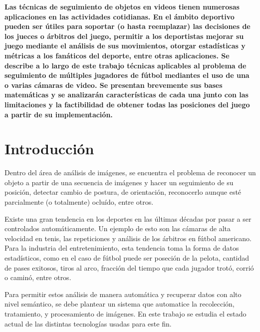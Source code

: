 \documentclass[a4paper,10pt]{article}
\title{}
\date{20 de Septiembre de 2013}
\author{Civile, Juan Pablo \and Crespo, Álvaro \and Ordano, Esteban }
\begin{document}
\pagestyle{fancy}
\maketitle
\thispagestyle{fancy}

\begin{customabstract}
\textbf{
Las técnicas de seguimiento de objetos en videos tienen numerosas aplicaciones
en las actividades cotidianas. En el ámbito deportivo pueden ser útiles para
soportar (o hasta reemplazar) las decisiones de los jueces o árbitros del
juego, permitir a los deportistas mejorar su juego mediante el análisis de sus
movimientos, otorgar estadísticas y métricas a los fanáticos del deporte, entre
otras aplicaciones. Se describe a lo largo de este trabajo técnicas
aplicables al problema de seguimiento de múltiples jugadores de fútbol
mediantes el uso de una o varias cámaras de video. Se presentan brevemente sus
bases matemáticas y se analizarán características de cada una junto con las
limitaciones y la factibilidad de obtener todas las posiciones del juego a
partir de su implementación.
} \end{customabstract}

\newpage

\part*{Introducción}

Dentro del área de análisis de imágenes, se encuentra el problema de reconocer
un objeto a partir de una secuencia de imágenes y hacer un seguimiento de su
posición, detectar cambio de postura, de orientación, reconocerlo aunque esté
parcialmente (o totalmente) ocluído, entre otros.

Existe una gran tendencia en los deportes en las últimas décadas por pasar a
ser controlados automáticamente. Un ejemplo de esto son las cámaras de alta
velocidad en tenis, las repeticiones y análisis de los árbitros en fútbol
americano. Para la industria del entretenimiento, esta tendencia toma la forma
de datos estadísticos, como en el caso de fútbol puede ser poseción de la
pelota, cantidad de pases exitosos, tiros al arco, fracción del tiempo que
cada jugador trotó, corrió o caminó, entre otros.

Para permitir estos análisis de manera automática y recuperar datos con alto
nivel semántico, se debe plantear un sistema que automatice la recolección,
tratamiento, y procesamiento de imágenes. En este trabajo se estudia el estado
actual de las distintas tecnologías usadas para este fin.
\end{document}
